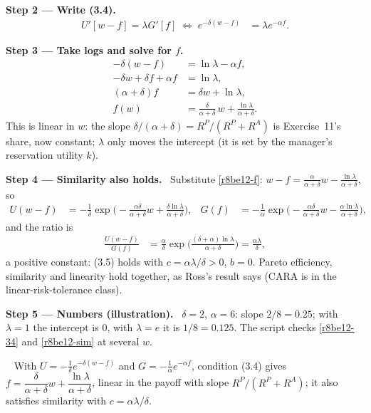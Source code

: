 \documentclass[11pt,a4paper]{article}
\newcommand{\step}[2]{\par\medskip\noindent\textbf{Step #1 --- #2.}~}
\newcommand{\answer}[1]{\par\smallskip\noindent\fbox{\textbf{Answer #1.}}~}
\begin{document}
\step{2}{Write (3.4)}
\begin{align}
  U'[w-f] = \lambda G'[f] \;\Longleftrightarrow\; e^{-\delta(w-f)} &= \lambda e^{-\alpha f}. \label{r8be12-34}
\end{align}

\step{3}{Take logs and solve for $f$}
\begin{align}
  -\delta(w-f) &= \ln\lambda - \alpha f, \nonumber\\
  -\delta w + \delta f + \alpha f &= \ln\lambda, \nonumber\\
  (\alpha+\delta) f &= \delta w + \ln\lambda, \nonumber\\
  f(w) &= \frac{\delta}{\alpha+\delta}\,w + \frac{\ln\lambda}{\alpha+\delta}. \label{r8be12-f}
\end{align}
This is linear in $w$: the slope $\delta/(\alpha+\delta)=R^P/(R^P+R^A)$ is Exercise~11's share, now constant; $\lambda$ only moves the intercept (it is set by the manager's reservation utility $k$).

\step{4}{Similarity also holds} Substitute \eqref{r8be12-f}: $w-f=\frac{\alpha}{\alpha+\delta}w-\frac{\ln\lambda}{\alpha+\delta}$, so
\begin{align}
  U(w-f) &= -\tfrac{1}{\delta}\exp\!\Big(-\tfrac{\alpha\delta}{\alpha+\delta}w + \tfrac{\delta\ln\lambda}{\alpha+\delta}\Big), &
  G(f) &= -\tfrac{1}{\alpha}\exp\!\Big(-\tfrac{\alpha\delta}{\alpha+\delta}w - \tfrac{\alpha\ln\lambda}{\alpha+\delta}\Big), \nonumber
\end{align}
and the ratio is
\begin{align}
  \frac{U(w-f)}{G(f)} &= \frac{\alpha}{\delta}\exp\!\Big(\tfrac{(\delta+\alpha)\ln\lambda}{\alpha+\delta}\Big) = \frac{\alpha\lambda}{\delta}, \label{r8be12-sim}
\end{align}
a positive constant: (3.5) holds with $c=\alpha\lambda/\delta>0$, $b=0$. Pareto efficiency, similarity and linearity hold together, as Ross's result says (CARA is in the linear-risk-tolerance class).

\step{5}{Numbers (illustration)} $\delta=2$, $\alpha=6$: slope $2/8=0.25$; with $\lambda=1$ the intercept is 0, with $\lambda=e$ it is $1/8=0.125$. The script checks \eqref{r8be12-34} and \eqref{r8be12-sim} at several $w$.

\answer{} With $U=-\frac1\delta e^{-\delta(w-f)}$ and $G=-\frac1\alpha e^{-\alpha f}$, condition (3.4) gives $f=\dfrac{\delta}{\alpha+\delta}w+\dfrac{\ln\lambda}{\alpha+\delta}$, linear in the payoff with slope $R^P/(R^P+R^A)$; it also satisfies similarity with $c=\alpha\lambda/\delta$.
\end{document}
